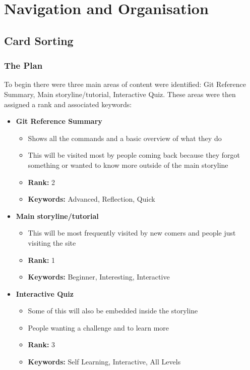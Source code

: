 
\section{Navigation and Organisation}
\subsection{Card Sorting}

\subsubsection{The Plan}
To begin there were three main areas of content were identified: Git Reference Summary, Main storyline/tutorial, Interactive Quiz. These areas were then assigned a rank and associated keywords:
\begin{itemize}
	\item\textbf{Git Reference Summary}
	\begin{itemize}
		\item Shows all the commands and a basic overview of what they do
		\item This will be visited most by people coming back because they forgot something or wanted to know more outside of the main storyline
		\item \textbf{Rank:} 2
		\item \textbf{Keywords:} Advanced, Reflection, Quick
	\end{itemize}
	\item\textbf{Main storyline/tutorial}
	\begin{itemize}
		\item This will be most frequently visited by new comers and people just visiting the site
		\item \textbf{Rank:} 1
		\item \textbf{Keywords:} Beginner, Interesting, Interactive
	\end{itemize}
	\item\textbf{Interactive Quiz}
	\begin{itemize}
		\item Some of this will also be embedded inside the storyline
		\item People wanting a challenge and to learn more
		\item \textbf{Rank:} 3
		\item \textbf{Keywords:} Self Learning, Interactive, All Levels
	\end{itemize}	
\end{itemize}

